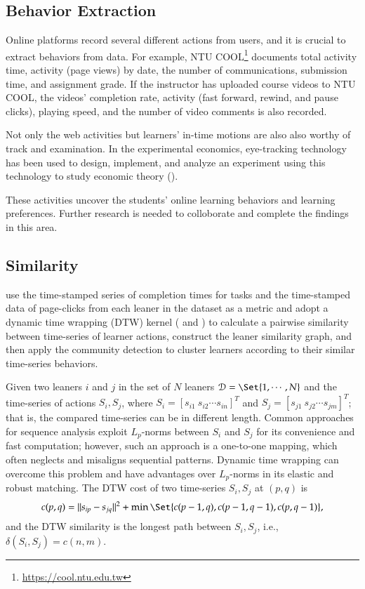 \documentclass[a4paper]{article}
\DeclarePairedDelimiter\norm{\lVert}{\rVert}
\theoremstyle{plain}
\begin{document}
\subsection{Behavior Extraction}
Online platforms record several different actions from users, and it is 
crucial to extract behaviors from data. 
For example, NTU COOL\footnote{\url{https://cool.ntu.edu.tw}} documents
total activity time,
activity (page views) by date, the number of communications, 
submission time, and assignment grade. If the instructor has uploaded course
videos to NTU COOL, the videos' completion rate, activity
(fast forward, rewind, and pause clicks), playing speed, and the number of video comments
is also recorded.

Not only the web activities but learners’ in-time motions are also also
worthy of track and examination. 
In the experimental economics,
eye-tracking technology has been used to design, implement, and analyze an experiment 
using this technology to study economic theory (\citet{eye}).

These activities uncover the students' online learning behaviors and learning preferences.
Further research is needed to colloborate and complete the findings in this area.

\subsection{Similarity}
\citet{behavclus} use the time-stamped series of completion times for tasks 
and the time-stamped data of page-clicks
from each leaner in the dataset as a metric
and adopt a dynamic time wrapping (DTW) kernel (\citet{dtw} and \citet{svmdtw}) 
to calculate a pairwise similarity between
time-series of learner actions, construct the leaner similarity graph, 
and then apply the community detection to cluster
learners according to their similar time-series behaviors.

Given two leaners $i$ and $j$ in the set of $N$ leaners $\mathcal{D}=\Set{1,\cdots,N}$
and the time-series of actions $S_i, S_j$, where $S_i = [s_{i1}\ s_{i2} \cdots s_{in}]^T$
and $S_j=[s_{j1}\ s_{j2}\cdots s_{jm}]^T$; that is, the compared time-series can be in different length.
Common approaches for sequence analysis exploit $L_{p}$-norms between $S_i$ and $S_j$
for its convenience and fast computation; however, such an approach is a one-to-one
mapping, which often neglects and misaligns sequential patterns.
Dynamic time wrapping can overcome this problem and
have advantages over $L_p$-norms in its elastic and robust matching.
The DTW cost of two time-series $S_i,S_j$ at $(p,q)$ is
\[
    c(p,q)=\norm{s_{ip}-s_{jq}}^2+\min\Set{c(p-1,q),c(p-1,q-1)
    ,c(p,q-1)},
\]
and the DTW similarity is the longest path between $S_i,S_j$,
i.e., $\delta(S_i,S_j)=c(n,m)$.
\end{document}
